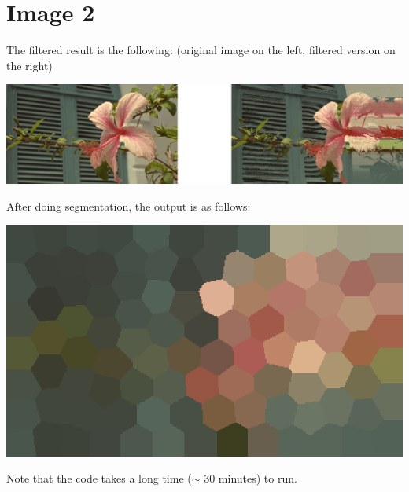 \documentclass[11pt]{report}
\begin{document}
\section*{Image 2}
The filtered result is the following: (original image on the left, filtered version on the right)
\newline \newline
\centerline{\includegraphics[scale=0.5]{flower_filtered.png}}
\newline \newline
After doing segmentation, the output is as follows:
\newline \newline
\centerline{\includegraphics[scale=0.5]{flower_segmented.png}}
\newline \newline \newline \newline
Note that the code takes a long time ($\sim$ 30 minutes) to run.
\end{document}
